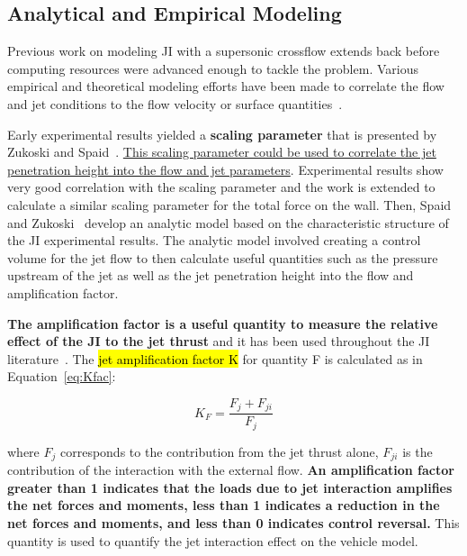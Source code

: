 \documentclass[12pt]{article}
\begin{document}
\subsection{Analytical and Empirical Modeling}
Previous work on modeling JI with a supersonic crossflow extends back before computing resources were advanced enough to tackle the problem. Various empirical and theoretical modeling efforts have been made to correlate the flow and jet conditions to the flow velocity or surface quantities~\cite{billig1971unified,werle1972jet,young1972viscous,demuren1994modeling}.

Early experimental results yielded a \textbf{scaling parameter} that is presented by Zukoski
and Spaid~\cite{zukoski1964secondary}. \ul{This scaling parameter could be used to correlate the jet penetration height into the flow and jet parameters}. Experimental results show very good correlation with the scaling parameter and the work is extended to calculate a similar scaling parameter for the total force on the wall. Then, Spaid and Zukoski~\cite{spaid1968study} develop an analytic model based on the characteristic structure of the JI experimental results. The analytic model involved creating a control volume for the jet flow to then calculate useful quantities such as the pressure upstream of the jet as well as the jet penetration height into the flow and amplification factor.

\textbf{The amplification factor is a useful quantity to measure the relative effect of the JI to the jet thrust} and it has been used throughout the JI literature~\cite{spaid1968study,spaid1973aerodynamic,roger1999aerodynamics,margason1993fifty}. The \hl{jet amplification factor K} for quantity F is calculated as in Equation~\ref{eq:Kfac}:

\begin{equation}
    K_F = \frac{F_j + F_{ji}}{F_j}
    \label{eq:Kfac}
\end{equation}

where $F_j$ corresponds to the contribution from the jet thrust alone, $F_{ji}$ is the contribution of the interaction with the external flow. \textbf{An amplification factor greater than 1 indicates that the loads due to jet interaction amplifies the net forces and moments, less than 1 indicates a reduction in the net forces and moments, and less than 0 indicates control reversal.} This quantity is used to quantify the jet interaction effect on the vehicle model.
\end{document}
